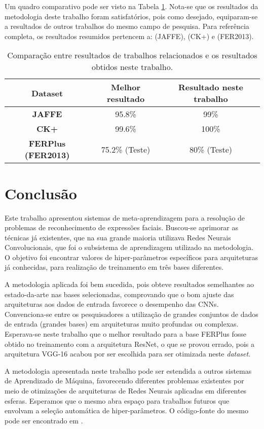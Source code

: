 \documentclass[
12pt,       %
openright,      %
oneside,      %
a4paper,      %
english,      %
french,       %
spanish,      %
brazil        %
]{abntex2}
\begin{document}
Um quadro comparativo pode ser visto na Tabela \ref{tab:comparacao-resultados}. Nota-se que os resultados da metodologia deste trabalho foram satisfatórios, pois como desejado, equiparam-se a resultados de outros trabalhos do mesmo campo de pesquisa. Para referência completa, os resultados resumidos pertencem a: \cite{hamester2015} (JAFFE), \cite{Yu2017DeeperCP} (CK+) e \cite{pramerdorfer2016facial} (FER2013).

\begin{table}[H]
\centering
\caption{Comparação entre resultados de trabalhos relacionados e os resultados obtidos neste trabalho.}
\label{tab:comparacao-resultados}
\begin{tabular}{@{}ccc@{}}
\toprule
\textbf{Dataset} & \textbf{Melhor resultado} & \textbf{Resultado neste trabalho} \\ \midrule
\textbf{JAFFE}   & 95.8\%                    & 99\%                              \\
\textbf{CK+}     & 99.6\%                    & 100\%                             \\
\textbf{FERPlus (FER2013)} & 75.2\% (Teste)            & 80\% (Teste)                      \\ \bottomrule
\end{tabular}
\end{table}

\chapter{Conclusão} \label{conclusao}

Este trabalho apresentou sistemas de meta-aprendizagem para a resolução de problemas de reconhecimento de expressões faciais. Buscou-se aprimorar as técnicas já existentes, que na sua grande maioria utilizava Redes Neurais Convolucionais, que foi o subsistema de aprendizagem utilizado na metodologia. O objetivo foi encontrar valores de hiper-parâmetros específicos para arquiteturas já conhecidas, para realização de treinamento em três bases diferentes.

A metodologia aplicada foi bem sucedida, pois obteve resultados semelhantes ao estado-da-arte nas bases selecionadas, comprovando que o bom ajuste das arquiteturas aos dados de entrada favorece o desempenho das CNNs. Convenciona-se entre os pesquisadores a utilização de grandes conjuntos de dados de entrada (grandes bases) em arquiteturas muito profundas ou complexas. Esperava-se neste trabalho que o melhor resultado para a base FERPlus fosse obtido no treinamento com a arquitetura ResNet, o que se provou errado, pois a arquitetura VGG-16 acabou por ser escolhida para ser otimizada neste \textit{dataset}.

A metodologia apresentada neste trabalho pode ser estendida a outros sistemas de Aprendizado de Máquina, favorecendo diferentes problemas existentes por meio de otimizações de arquiteturas de Redes Neurais aplicadas em diferentes esferas. Esperamos que o mesmo abra espaço para trabalhos futuros que envolvam a seleção automática de hiper-parâmetros. O código-fonte do mesmo pode ser encontrado em .


\postextual


\end{document}
